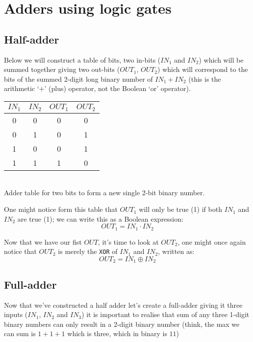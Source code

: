 \documentclass{article}
\newcommand{\code}[1]{\texttt{#1}}
\begin{document}
\section[Adders]{Adders using logic gates}
\subsection{Half-adder}
Below we will construct a table of bits, two in-bits ($IN_1$ and $IN_2$) which will be summed together giving two out-bits ($OUT_1$, $OUT_2$)
which will correspond to the bits of the summed 2-digit long binary number of $IN_1 + IN_2$ (this is the arithmetic `$+$' (plus) operator, not the Boolean `or' operator).

\begin{center}
\begin{tabular}{ | c c | c c | }
 \hline
    $IN_1$ & $IN_2$ & $OUT_1$ & $OUT_2$\\
 \hline
    0 & 0 & 0 & 0\\
 \hline
    0 & 1 & 0 & 1\\
 \hline
    1 & 0 & 0 & 1\\
 \hline
    1 & 1 & 1 & 0\\
 \hline
\end{tabular}
\\ \vspace{2mm} Adder table for two bits to form a new single 2-bit binary number.
\end{center}

One might notice form this table that $OUT_1$ will only be true (1) if both $IN_1$ and $IN_2$ are true (1); we can write this as a Boolean expression: \[OUT_1 = IN_1 \cdot IN_2\]

Now that we have our fist $OUT$, it's time to look at $OUT_2$, one might once again notice that $OUT_2$ is merely the \code{XOR} of $IN_1$ and $IN_2$, written as: \[OUT_2 = IN_1 \oplus IN_2\]

\subsection{Full-adder}
Now that we've constructed a half adder let's create a full-adder giving it three inputs ($IN_1$, $IN_2$ and $IN_3$) it is important to realise that sum of any three 1-digit binary numbers can only result in a 2-digit binary number (think, the max we can sum is $1 + 1 + 1$ which is three, which in binary is $11$)
\end{document}
